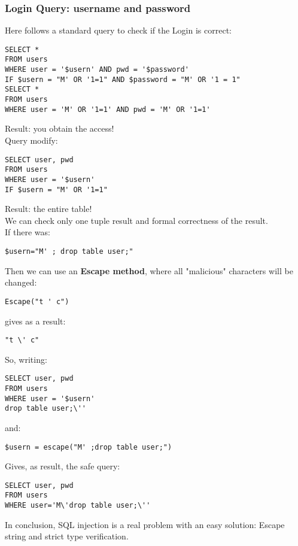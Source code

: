 \subsubsection{Login Query: username and password} 
Here follows a standard query to check if the Login is correct:
\begin{lstlisting}
SELECT * 
FROM users 
WHERE user = '$usern' AND pwd = '$password'
IF $usern = "M' OR '1=1" AND $password = "M' OR '1 = 1" 
SELECT * 
FROM users 
WHERE user = 'M' OR '1=1' AND pwd = 'M' OR '1=1'
\end{lstlisting}
Result: you obtain the access!\\
Query modify:
\begin{lstlisting}
SELECT user, pwd 
FROM users 
WHERE user = '$usern' 
IF $usern = "M' OR '1=1" 
\end{lstlisting}
Result: the entire table!\\
We can check only one tuple result and formal correctness of the result.\\
If there was:  
\begin{lstlisting} 
$usern="M' ; drop table user;"
\end{lstlisting}
Then we can use an \textbf{Escape method}, where all "malicious" characters will be changed:
\begin{lstlisting} 
Escape("t ' c") 
\end{lstlisting}
gives as a result:
\begin{lstlisting} 
"t \' c"
\end{lstlisting}
So, writing:
\begin{lstlisting} 
SELECT user, pwd 
FROM users 
WHERE user = '$usern'
drop table user;\''
\end{lstlisting}
and:
\begin{lstlisting} 
$usern = escape("M' ;drop table user;")
\end{lstlisting}
Gives, as result, the safe query:
\begin{lstlisting} 
SELECT user, pwd 
FROM users 
WHERE user='M\'drop table user;\''
\end{lstlisting}
In conclusion, SQL injection is a real problem with an easy solution: Escape string and strict type verification.

